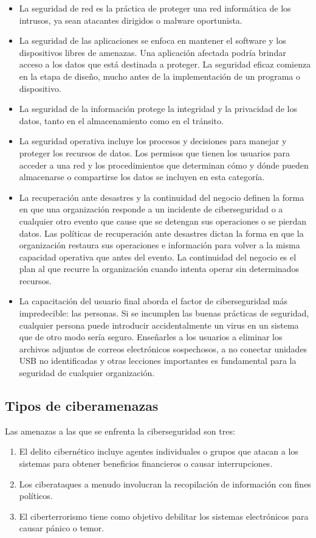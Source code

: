 \documentclass[12pt]{article}
\begin{document}
\begin{itemize}
    \item La seguridad de red es la práctica de proteger una red informática de los intrusos, ya sean atacantes dirigidos o malware oportunista.
    \item La seguridad de las aplicaciones se enfoca en mantener el software y los dispositivos libres de amenazas. Una aplicación afectada podría brindar acceso a los datos que está destinada a proteger. La seguridad eficaz comienza en la etapa de diseño, mucho antes de la implementación de un programa o dispositivo.
    \item La seguridad de la información protege la integridad y la privacidad de los datos, tanto en el almacenamiento como en el tránsito.
    \item La seguridad operativa incluye los procesos y decisiones para manejar y proteger los recursos de datos. Los permisos que tienen los usuarios para acceder a una red y los procedimientos que determinan cómo y dónde pueden almacenarse o compartirse los datos se incluyen en esta categoría.
    \item La recuperación ante desastres y la continuidad del negocio definen la forma en que una organización responde a un incidente de ciberseguridad o a cualquier otro evento que cause que se detengan sus operaciones o se pierdan datos. Las políticas de recuperación ante desastres dictan la forma en que la organización restaura sus operaciones e información para volver a la misma capacidad operativa que antes del evento. La continuidad del negocio es el plan al que recurre la organización cuando intenta operar sin determinados recursos.
    \item La capacitación del usuario final aborda el factor de ciberseguridad más impredecible: las personas. Si se incumplen las buenas prácticas de seguridad, cualquier persona puede introducir accidentalmente un virus en un sistema que de otro modo sería seguro. Enseñarles a los usuarios a eliminar los archivos adjuntos de correos electrónicos sospechosos, a no conectar unidades USB no identificadas y otras lecciones importantes es fundamental para la seguridad de cualquier organización.
\end{itemize}
\subsection*{Tipos de ciberamenazas}
Las amenazas a las que se enfrenta la ciberseguridad son tres:
\begin{enumerate}
    \item El delito cibernético incluye agentes individuales o grupos que atacan a los sistemas para obtener beneficios financieros o causar interrupciones.
    \item Los ciberataques a menudo involucran la recopilación de información con fines políticos.
    \item El ciberterrorismo tiene como objetivo debilitar los sistemas electrónicos para causar pánico o temor.
\end{enumerate}
\end{document}
